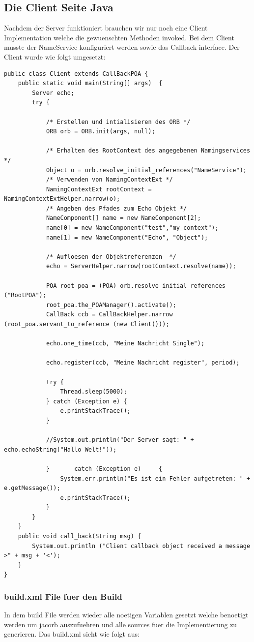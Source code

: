 \subsection{Die Client Seite Java}
Nachdem der Server funktioniert brauchen wir nur noch eine Client Implementation welche die gewuenschten Methoden invoked.
Bei dem Client musste der NameService konfiguriert werden sowie das Callback interface.
Der Client wurde wie folgt umgesetzt:
\begin{lstlisting}[style=Java, caption=Code des Clients \cite{borkoRepo}]
public class Client extends CallBackPOA {
	public static void main(String[] args)  {
		Server echo;
		try {

			/* Erstellen und intialisieren des ORB */
			ORB orb = ORB.init(args, null);

			/* Erhalten des RootContext des angegebenen Namingservices */
			Object o = orb.resolve_initial_references("NameService");
			/* Verwenden von NamingContextExt */
			NamingContextExt rootContext = NamingContextExtHelper.narrow(o);
			/* Angeben des Pfades zum Echo Objekt */
			NameComponent[] name = new NameComponent[2];
			name[0] = new NameComponent("test","my_context");
			name[1] = new NameComponent("Echo", "Object");

			/* Aufloesen der Objektreferenzen  */
			echo = ServerHelper.narrow(rootContext.resolve(name));

			POA root_poa = (POA) orb.resolve_initial_references ("RootPOA");
			root_poa.the_POAManager().activate();
			CallBack ccb = CallBackHelper.narrow (root_poa.servant_to_reference (new Client()));

			echo.one_time(ccb, "Meine Nachricht Single");

			echo.register(ccb, "Meine Nachricht register", period);

			try {
				Thread.sleep(5000);
			} catch (Exception e) {
				e.printStackTrace();
			}

			//System.out.println("Der Server sagt: " + echo.echoString("Hallo Welt!"));

			}       catch (Exception e)     {
				System.err.println("Es ist ein Fehler aufgetreten: " + e.getMessage());
				e.printStackTrace();
			}
		}
	}
	public void call_back(String msg) {
		System.out.println ("Client callback object received a message >" + msg + '<');
	}
}

\end{lstlisting}

\clearpage

\subsubsection{build.xml File fuer den Build}
In dem build File werden wieder alle noetigen Variablen gesetzt welche benoetigt werden um jacorb auszufuehren und alle sources fuer die Implementierung zu generieren.
Das build.xml sieht wie folgt aus:

